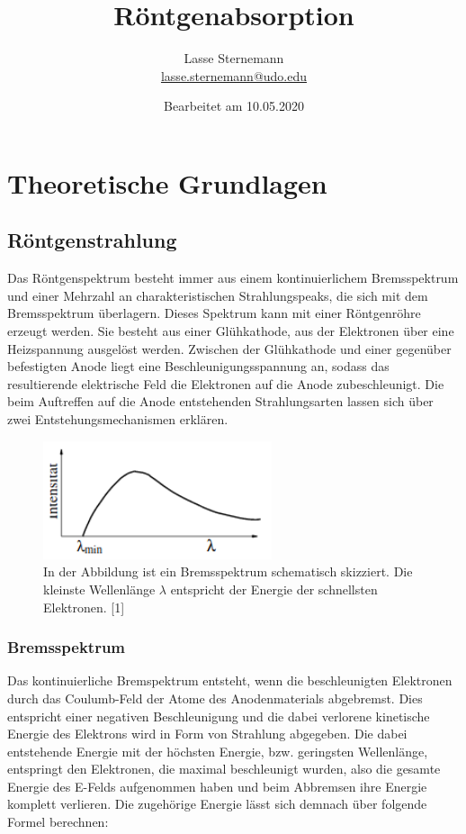 \documentclass[titlepage = firstcover]{scrartcl}
\title{Röntgenabsorption}
\author{
  Lasse Sternemann\\
  \href{mailto:lasse.sternemann@udo.edu}{lasse.sternemann@udo.edu}
}
\date{Bearbeitet am 10.05.2020}
\begin{document}
    \maketitle
    \newpage
    \tableofcontents
    \newpage


    \section{Theoretische Grundlagen}
        \subsection{Röntgenstrahlung} \label{Röntgen}
            Das Röntgenspektrum besteht immer aus einem kontinuierlichem Bremsspektrum und einer Mehrzahl an charakteristischen Strahlungspeaks, die sich mit dem Bremsspektrum überlagern.
            Dieses Spektrum kann mit einer Röntgenröhre erzeugt werden. Sie besteht aus einer Glühkathode, aus der Elektronen über eine Heizspannung ausgelöst werden. Zwischen der Glühkathode und einer
            gegenüber befestigten Anode liegt eine Beschleunigungsspannung an, sodass das resultierende elektrische Feld die Elektronen auf die Anode zubeschleunigt. Die beim Auftreffen auf die Anode 
            entstehenden Strahlungsarten lassen sich über zwei Entstehungsmechanismen erklären.

            \FloatBarrier

            \begin{figure}[h]
              \centering
              \includegraphics[width = 0.6\textwidth]{Brems.png}
              \caption{In der Abbildung ist ein Bremsspektrum schematisch skizziert. Die kleinste Wellenlänge $\lambda$ entspricht der Energie der schnellsten Elektronen. [1]}
              \label{fig:SkizzeBrems}
            \end{figure}

            \FloatBarrier

            \subsubsection{Bremsspektrum}
                Das kontinuierliche Bremspektrum entsteht, wenn die beschleunigten Elektronen durch das Coulumb-Feld der Atome des Anodenmaterials abgebremst. Dies entspricht einer negativen 
                Beschleunigung und die dabei verlorene kinetische Energie des Elektrons wird in Form von Strahlung abgegeben. Die dabei entstehende Energie mit der höchsten Energie, bzw. geringsten 
                Wellenlänge, entspringt den Elektronen, die maximal beschleunigt wurden, also die gesamte Energie des E-Felds aufgenommen haben und beim Abbremsen ihre Energie komplett verlieren. 
                Die zugehörige Energie lässt sich demnach über folgende Formel berechnen:
\end{document}
